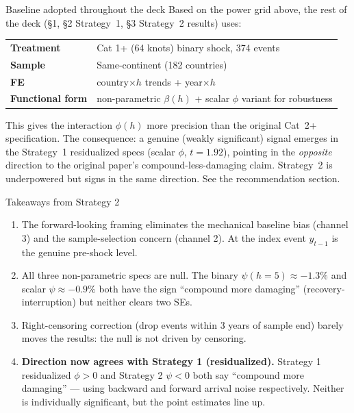 \documentclass[aspectratio=169]{beamer}
\begin{document}
\begin{frame}{Baseline adopted throughout the deck}
Based on the power grid above, the rest of the deck (\S1, \S2 Strategy~1, \S3 Strategy~2 results) uses:

\medskip
\begin{center}
\begin{tabular}{ll}
\textbf{Treatment}       & Cat 1+ (64 knots) binary shock, 374 events \\
\textbf{Sample}          & Same-continent (182 countries) \\
\textbf{FE}              & country$\times h$ trends + year$\times h$ \\
\textbf{Functional form} & non-parametric $\beta(h)$ + scalar $\phi$ variant for robustness \\
\end{tabular}
\end{center}

\medskip
This gives the interaction $\phi(h)$ more precision than the original Cat~2+ specification. The consequence: a genuine (weakly significant) signal emerges in the Strategy~1 residualized specs (scalar $\phi$, $t=1.92$), pointing in the \emph{opposite} direction to the original paper's compound-less-damaging claim. Strategy~2 is underpowered but signs in the same direction. See the recommendation section.
\end{frame}

\begin{frame}{Takeaways from Strategy 2}
\begin{enumerate}
  \item The forward-looking framing eliminates the mechanical baseline bias (channel 3) and the sample-selection concern (channel 2). At the index event $y_{t-1}$ is the genuine pre-shock level.

  \medskip
  \item All three non-parametric specs are null. The binary $\psi(h{=}5) \approx -1.3\%$ and scalar $\psi \approx -0.9\%$ both have the sign ``compound more damaging'' (recovery-interruption) but neither clears two SEs.

  \medskip
  \item Right-censoring correction (drop events within 3 years of sample end) barely moves the results: the null is not driven by censoring.

  \medskip
  \item \textbf{Direction now agrees with Strategy 1 (residualized).} Strategy 1 residualized $\phi > 0$ and Strategy 2 $\psi < 0$ both say ``compound more damaging'' --- using backward and forward arrival noise respectively. Neither is individually significant, but the point estimates line up.
\end{enumerate}
\end{frame}
\end{document}
